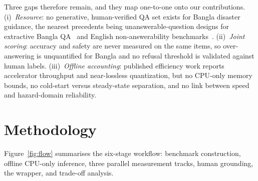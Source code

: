 \documentclass[conference]{IEEEtran}
\begin{document}
Three gaps therefore remain, and they map one-to-one onto our contributions. (i)~\emph{Resource}: no
generative, human-verified QA set exists for Bangla disaster guidance, the nearest precedents being
unanswerable-question designs for extractive Bangla QA~\cite{banglaqa} and English non-answerability
benchmarks~\cite{squad2}. (ii)~\emph{Joint scoring}: accuracy and safety are never measured on the
same items, so over-answering is unquantified for Bangla and no refusal threshold is validated
against human labels. (iii)~\emph{Offline accounting}: published efficiency work reports accelerator
throughput and near-lossless quantization, but no CPU-only memory bounds, no cold-start versus
steady-state separation, and no link between speed and hazard-domain reliability.

\section{Methodology}
Figure~\ref{fig:flow} summarises the six-stage workflow: benchmark construction, offline CPU-only
inference, three parallel measurement tracks, human grounding, the wrapper, and trade-off analysis.
\end{document}
